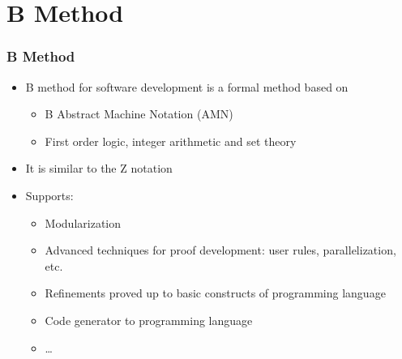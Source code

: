 \section{B Method}

\begin{frame}
\hypertarget{metodoB}{}
  \frametitle{B Method} 
  \begin{itemize}
    \item B method for software development is a formal method based on
	    \begin{itemize}
	    \item  B Abstract Machine Notation (AMN)
	    \item  First order logic, integer arithmetic and set theory
	    \end{itemize}
    \item It is similar to the Z notation
    \item Supports:
    \begin{itemize}
	    \item Modularization
	    \item Advanced techniques for proof development: user rules, parallelization, etc.
	    \item Refinements proved up to basic constructs of programming language  
	    \item Code generator to programming language
	    \item \ldots
    \end{itemize}   
  \end{itemize}
\end{frame}
    
